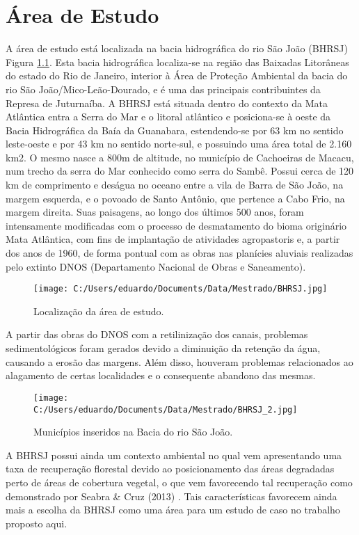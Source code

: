\chapter{Área de Estudo}
A área de estudo está localizada na bacia hidrográfica do rio São João (BHRSJ) Figura \ref{fig:locareaestudo}. Esta bacia hidrográfica localiza-se na região das Baixadas Litorâneas do estado do Rio de Janeiro, interior à Área de Proteção Ambiental da bacia do rio São João/Mico-Leão-Dourado, e é uma das principais contribuintes da Represa de Juturnaíba. A BHRSJ está situada dentro do contexto da Mata Atlântica entra a Serra do Mar e o litoral atlântico e posiciona-se à oeste da Bacia Hidrográfica da Baía da Guanabara, estendendo-se por 63 km no sentido leste-oeste e por 43 km no sentido norte-sul, e possuindo uma área total de 2.160 km2. O mesmo nasce a 800m de altitude, no município de Cachoeiras de Macacu, num trecho da serra do Mar conhecido como serra do Sambê. Possui cerca de 120 km de comprimento e deságua no oceano entre a vila de Barra de São João, na margem esquerda, e o povoado de Santo Antônio, que pertence a Cabo Frio, na margem direita. Suas paisagens, ao longo dos últimos 500 anos, foram intensamente modificadas com o processo de desmatamento do bioma originário Mata Atlântica, com fins de implantação de atividades agropastoris e, a partir dos anos de 1960, de forma pontual com as obras nas planícies aluviais realizadas pelo extinto DNOS (Departamento Nacional de Obras e Saneamento). \\

	\begin{figure}
	\centering
	\texttt{[image: C:/Users/eduardo/Documents/Data/Mestrado/BHRSJ.jpg]} 
	\caption{Localização da área de estudo.}
	\label{fig:locareaestudo}
	\end{figure}

A partir das obras do DNOS com a retilinização dos canais, problemas sedimentológicos foram gerados devido a diminuição da retenção da água, causando a erosão das margens. Além disso, houveram problemas relacionados ao alagamento de certas localidades e o consequente abandono das mesmas. \\

	\begin{figure}
	\centering
	\texttt{[image: C:/Users/eduardo/Documents/Data/Mestrado/BHRSJ\_2.jpg]} 
	\caption{Municípios inseridos na Bacia do rio São João.}
	\end{figure}

A BHRSJ possui ainda um contexto ambiental no qual vem apresentando uma taxa de recuperação florestal devido ao posicionamento das áreas degradadas perto de áreas de cobertura vegetal, o que vem favorecendo tal recuperação como demonstrado por Seabra \& Cruz (2013) \cite{SEABRA_CRUZ}. Tais características favorecem ainda mais a escolha da BHRSJ como uma área para um estudo de caso no trabalho proposto aqui. \\

